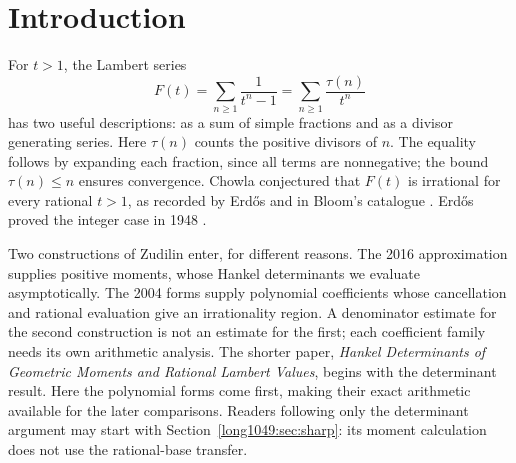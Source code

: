 \maketitle
\noteprovenance

\begin{abstract}
We give complete proofs of the fixed-base Hankel asymptotic for
Zudilin's normalised moments and the rational-base irrationality
criterion $\log b/\log a<0.4056830213840605\ldots$ for the Lambert
series $F(a/b)$. The determinant proof separates geometric node
configurations from their positive weights. The irrationality
proof instead specialises the polynomial forms of Zudilin's 2004
construction after cancellation. We also examine coefficient
moments, evaluated lattices and congruence conditions, distinguishing
integer divisibility from nonzero remainder decay. A broader
ratio-limit argument and a rational-value model are retained as
unformalised remarks. None of these arguments settles $F(3/2)$.
\end{abstract}

\section{Introduction}\label{long1049:sec:problem}

For $t>1$, the Lambert series
\[
 F(t)=\sum_{n\ge1}\frac1{t^n-1}
     =\sum_{n\ge1}\frac{\tau(n)}{t^n}
\]
has two useful descriptions: as a sum of simple fractions and as
a divisor generating series. Here $\tau(n)$ counts the positive
divisors of $n$. The equality follows by expanding each fraction,
since all terms are nonnegative; the bound $\tau(n)\le n$ ensures
convergence. Chowla conjectured that $F(t)$ is irrational for every
rational $t>1$, as recorded by Erd\H{o}s \cite[p.~102]{erdos1988}
and in Bloom's catalogue \cite{erdosproblems}. Erd\H{o}s proved the
integer case in 1948 \cite{erdos1948}.

Two constructions of Zudilin enter, for different reasons.
The 2016 approximation \cite{zudilin2016} supplies positive
moments, whose Hankel determinants we evaluate asymptotically.
The 2004 forms \cite{zudilin2004} supply polynomial coefficients
whose cancellation and rational evaluation give an irrationality
region. A denominator estimate for the second construction is not an
estimate for the first; each coefficient family needs its own
arithmetic analysis. The shorter paper,
\emph{Hankel Determinants of Geometric Moments and Rational Lambert
Values}, begins with the determinant result. Here the polynomial
forms come first, making their exact arithmetic available for the
later comparisons. Readers following only the determinant argument
may start with Section~\ref{long1049:sec:sharp}: its moment calculation
does not use the rational-base transfer.

